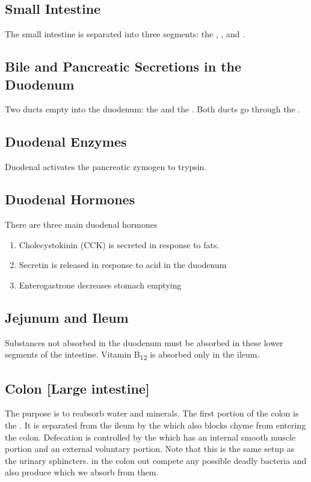 \documentclass[../Bio_chemistryReview.tex]{subfiles}
\begin{document}
\subsection{Small Intestine}
The small intestine is separated into three segments: the ,
, and .

\subsection{Bile and Pancreatic Secretions in the Duodenum}
Two ducts empty into the duodenum: the  and the
. Both ducts go through the .

\subsection{Duodenal Enzymes}
Duodenal  activates the pancreatic zymogen
 to trypsin.

\subsection{Duodenal Hormones}
There are three main duodenal hormones
\begin{enumerate}
    \item Cholecystokinin (CCK) is secreted in response to fats.
    \item Secretin is released in response to acid in the duodenum
    \item Enterogastrone decreases stomach emptying
\end{enumerate}

\subsection{Jejunum and Ileum}
Substances not absorbed in the duodenum must be absorbed in these lower segments
of the intestine. Vitamin B\textsubscript{12} is absorbed only in the ileum.

\subsection{Colon [Large intestine]}
The purpose is to reabsorb water and minerals. The first portion of the colon is
the . It is separated from the ileum by the  which also blocks chyme from entering the colon. Defecation is controlled
by the  which has an internal smooth muscle portion and
an external voluntary portion. Note that this is the same setup as the urinary
sphincters.  in the colon out compete any possible
deadly bacteria and also produce  which we absorb from them.
\end{document}

